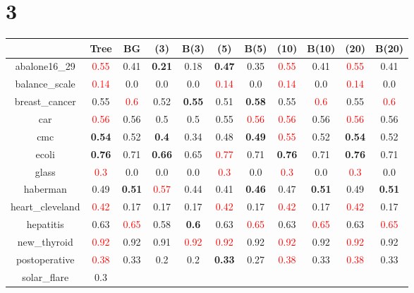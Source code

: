 \documentclass{article}%
\begin{document}
\section*{3}%
\begin{tabular}{c|cccccccccc}%
\hline%
&Tree&BG&(3)&B(3)&(5)&B(5)&(10)&B(10)&(20)&B(20)\\%
\hline%
abalone16\_29&\textcolor{red}{ 
0.55
}&0.41&\textbf{0.21}&0.18&\textbf{0.47}&0.35&\textcolor{red}{ 
0.55
}&0.41&\textcolor{red}{ 
0.55
}&0.41\\%
\hline%
balance\_scale&\textcolor{red}{ 
0.14
}&0.0&0.0&0.0&\textcolor{red}{ 
0.14
}&0.0&\textcolor{red}{ 
0.14
}&0.0&\textcolor{red}{ 
0.14
}&0.0\\%
\hline%
breast\_cancer&0.55&\textcolor{red}{ 
0.6
}&0.52&\textbf{0.55}&0.51&\textbf{0.58}&0.55&\textcolor{red}{ 
0.6
}&0.55&\textcolor{red}{ 
0.6
}\\%
\hline%
car&\textcolor{red}{ 
0.56
}&0.56&0.5&0.5&0.55&\textcolor{red}{ 
0.56
}&\textcolor{red}{ 
0.56
}&0.56&\textcolor{red}{ 
0.56
}&0.56\\%
\hline%
cmc&\textbf{0.54}&0.52&\textbf{0.4}&0.34&0.48&\textbf{0.49}&\textcolor{red}{ 
0.55
}&0.52&\textbf{0.54}&0.52\\%
\hline%
ecoli&\textbf{0.76}&0.71&\textbf{0.66}&0.65&\textcolor{red}{ 
0.77
}&0.71&\textbf{0.76}&0.71&\textbf{0.76}&0.71\\%
\hline%
glass&\textcolor{red}{ 
0.3
}&0.0&0.0&0.0&\textcolor{red}{ 
0.3
}&0.0&\textcolor{red}{ 
0.3
}&0.0&\textcolor{red}{ 
0.3
}&0.0\\%
\hline%
haberman&0.49&\textbf{0.51}&\textcolor{red}{ 
0.57
}&0.44&0.41&\textbf{0.46}&0.47&\textbf{0.51}&0.49&\textbf{0.51}\\%
\hline%
heart\_cleveland&\textcolor{red}{ 
0.42
}&0.17&0.17&0.17&\textcolor{red}{ 
0.42
}&0.17&\textcolor{red}{ 
0.42
}&0.17&\textcolor{red}{ 
0.42
}&0.17\\%
\hline%
hepatitis&0.63&\textcolor{red}{ 
0.65
}&0.58&\textbf{0.6}&0.63&\textcolor{red}{ 
0.65
}&0.63&\textcolor{red}{ 
0.65
}&0.63&\textcolor{red}{ 
0.65
}\\%
\hline%
new\_thyroid&\textcolor{red}{ 
0.92
}&0.92&0.91&\textcolor{red}{ 
0.92
}&\textcolor{red}{ 
0.92
}&0.92&\textcolor{red}{ 
0.92
}&0.92&\textcolor{red}{ 
0.92
}&0.92\\%
\hline%
postoperative&\textcolor{red}{ 
0.38
}&0.33&0.2&0.2&\textbf{0.33}&0.27&\textcolor{red}{ 
0.38
}&0.33&\textcolor{red}{ 
0.38
}&0.33\\%
\hline%
solar\_flare&0.3&\textcolor{red}{ 
}
\end{tabular}
\end{document}
